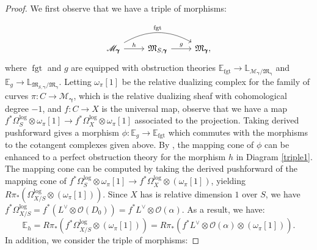\documentclass[12pt, oneside]{amsart}   	%
\newcommand{\fgt}{\operatorname{fgt}}
\numberwithin{equation}{section}
\numberwithin{thm}{section}
\numberwithin{figure}{section}
\begin{document}
\begin{proof}
We first observe that we have a triple of morphisms:

\begin{equation}\label{triple1}
\begin{tikzcd}
\mathscr{M}_{\pmb\gamma} \arrow[r,"h"] \arrow[bend left,"\fgt"]{rr} &  \mathfrak{M}_{S,\pmb\gamma} \arrow[r,"g"] &  \mathfrak{M}_{\pmb\gamma},
\end{tikzcd}
\end{equation}
where $\fgt$ and $g$ are equipped with obstruction theories $\mathbb{E}_{\fgt} \rightarrow \mathbb{L}_{\mathscr{M}_{\pmb\gamma}/\mathfrak{M}_{\pmb\gamma}}$ and $\mathbb{E}_g \rightarrow \mathbb{L}_{\mathfrak{M}_{S,\pmb\gamma}/\mathfrak{M}_{\pmb\gamma}}$. Letting $\omega_{\pi}[1]$ be the relative dualizing complex for the family of curves $\pi: C\rightarrow \mathscr{M}_{\pmb\gamma}$, which is the relative dualizing sheaf with cohomological degree $-1$, and $f: C \rightarrow X$ is the universal map, observe that we have a map $f^*\Omega_S^{\log}\otimes \omega_{\pi}[1]\rightarrow f^*\Omega^{\log}_{X}\otimes \omega_{\pi}[1]$ associated to the projection. Taking derived pushforward gives a morphism $\phi: \mathbb{E}_g \rightarrow \mathbb{E}_{\fgt}$ which commutes with the morphisms to the cotangent complexes given above. By \cite[Construction $3.13$]{vpull}, the mapping cone of $\phi$ can be enhanced to a perfect obstruction theory for the morphism $h$ in Diagram \ref{triple1}. The mapping cone can be computed by taking the derived pushforward of the mapping cone of $f^*\Omega_S^{\log}\otimes \omega_{\pi}[1]\rightarrow f^*\Omega^{\log}_{X}\otimes (\omega_{\pi}[1])$, yielding $R\pi_*(\Omega_{X/S}^{\log}\otimes (\omega_{\pi}[1]))$. Since $X$ has is relative dimension $1$ over $S$, we have $f^*\Omega_{X/S}^{\log} = f^*(L^{\vee} \otimes \mathcal{O}(D_0)) = f^*L^{\vee} \otimes \mathcal{O}(\alpha).$ As a result, we have:
\[\mathbb{E}_h = R\pi_*(f^*\Omega_{X/S}^{\log}\otimes (\omega_{\pi}[1]))  = R\pi_*(f^*L^{\vee}\otimes \mathcal{O}( \alpha)\otimes (\omega_{\pi}[1])).\]
In addition, we consider the triple of morphisms:


\end{proof}
\end{document}
